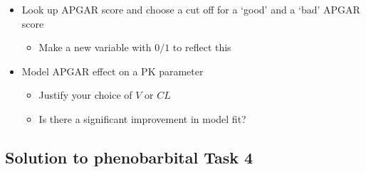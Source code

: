 \documentclass[
]{article}
\providecommand{\tightlist}{%
  \setlength{\itemsep}{0pt}\setlength{\parskip}{0pt}}
\begin{document}
\begin{itemize}
\tightlist
\item
  Look up APGAR score and choose a cut off for a `good' and a `bad' APGAR score

  \begin{itemize}
  \tightlist
  \item
    Make a new variable with \(0/1\) to reflect this
  \end{itemize}
\item
  Model APGAR effect on a PK parameter

  \begin{itemize}
  \tightlist
  \item
    Justify your choice of \(V\) or \(CL\)
  \item
    Is there a significant improvement in model fit?
  \end{itemize}
\end{itemize}

\newpage

\subsection{Solution to phenobarbital Task 4}\label{solution-to-phenobarbital-task-4}
\end{document}
